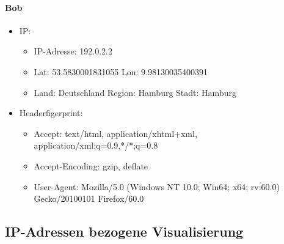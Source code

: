 \documentclass[
    fontsize=12pt,
    headings=small,
    parskip=half,           %
    bibliography=totoc,
    numbers=noenddot,       %
    open=any,               %
    ]{scrreprt}
\begin{document}
\paragraph{Bob}
\begin{itemize}
  \item IP: 
  \begin{itemize}
  \item IP-Adresse: 192.0.2.2
  \item Lat: 53.5830001831055 Lon: 9.98130035400391
  \item Land: Deutschland Region: Hamburg Stadt: Hamburg
  \end{itemize}
  \item Headerfigerprint:  
  \begin{itemize}
  \item Accept: text/html, application/xhtml+xml, application/xml;q=0.9,*/*;q=0.8
  \item Accept-Encoding: gzip, deflate
  \item User-Agent: Mozilla/5.0 (Windows NT 10.0; Win64; x64; rv:60.0) Gecko/20100101 Firefox/60.0
  \end{itemize}
\end{itemize}

    \subsection{IP-Adressen bezogene Visualisierung} \label{ipVis}
\end{document}
